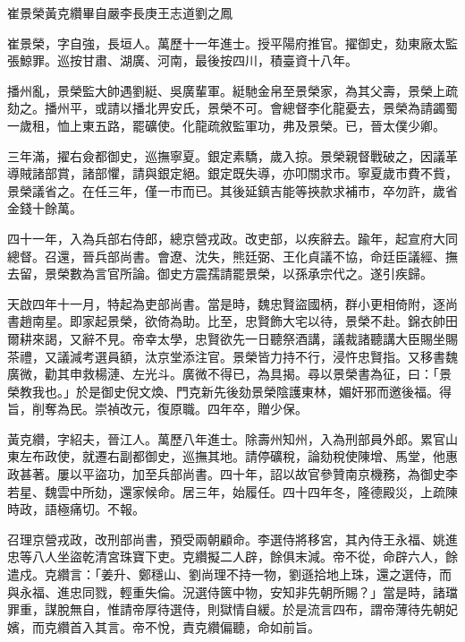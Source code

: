 
\begin{pinyinscope}
崔景榮黃克纘畢自嚴李長庚王志道劉之鳳

崔景榮，字自強，長垣人。萬歷十一年進士。授平陽府推官。擢御史，劾東廠太監張鯨罪。巡按甘肅、湖廣、河南，最後按四川，積臺資十八年。

播州亂，景榮監大帥遇劉綎、吳廣輩軍。綎馳金帛至景榮家，為其父壽，景榮上疏劾之。播州平，或請以播北畀安氏，景榮不可。會總督李化龍憂去，景榮為請蠲蜀一歲租，恤上東五路，罷礦使。化龍疏敘監軍功，弗及景榮。已，晉太僕少卿。

三年滿，擢右僉都御史，巡撫寧夏。銀定素驕，歲入掠。景榮親督戰破之，因議革導賊諸部賞，諸部懼，請與銀定絕。銀定既失導，亦叩關求市。寧夏歲市費不貲，景榮議省之。在任三年，僅一市而已。其後延鎮吉能等挾款求補市，卒勿許，歲省金錢十餘萬。

四十一年，入為兵部右侍郎，總京營戎政。改吏部，以疾辭去。踰年，起宣府大同總督。召還，晉兵部尚書。會遼、沈失，熊廷弼、王化貞議不協，命廷臣議經、撫去留，景榮數為言官所論。御史方震孺請罷景榮，以孫承宗代之。遂引疾歸。

天啟四年十一月，特起為吏部尚書。當是時，魏忠賢盜國柄，群小更相倚附，逐尚書趙南星。即家起景榮，欲倚為助。比至，忠賢飾大宅以待，景榮不赴。錦衣帥田爾耕來謁，又辭不見。帝幸太學，忠賢欲先一日聽祭酒講，議裁諸聽講大臣賜坐賜茶禮，又議減考選員額，汰京堂添注官。景榮皆力持不行，浸忤忠賢指。又移書魏廣微，勸其申救楊漣、左光斗。廣微不得已，為具揭。尋以景榮書為征，曰：「景榮教我也。」於是御史倪文煥、門克新先後劾景榮陰護東林，媚奸邪而邀後福。得旨，削奪為民。崇禎改元，復原職。四年卒，贈少保。

黃克纘，字紹夫，晉江人。萬歷八年進士。除壽州知州，入為刑部員外郎。累官山東左布政使，就遷右副都御史，巡撫其地。請停礦稅，論劾稅使陳增、馬堂，他惠政甚著。屢以平盜功，加至兵部尚書。四十年，詔以故官參贊南京機務，為御史李若星、魏雲中所劾，還家候命。居三年，始履任。四十四年冬，隆德殿災，上疏陳時政，語極痛切。不報。

召理京營戎政，改刑部尚書，預受兩朝顧命。李選侍將移宮，其內侍王永福、姚進忠等八人坐盜乾清宮珠寶下吏。克纘擬二人辟，餘俱末減。帝不從，命辟六人，餘遣戍。克纘言：「姜升、鄭穩山、劉尚理不持一物，劉遜拾地上珠，還之選侍，而與永福、進忠同戮，輕重失倫。況選侍篋中物，安知非先朝所賜？」當是時，諸璫罪重，謀脫無自，惟請帝厚待選侍，則獄情自緩。於是流言四布，謂帝薄待先朝妃嬪，而克纘首入其言。帝不悅，責克纘偏聽，命如前旨。


\end{pinyinscope}
